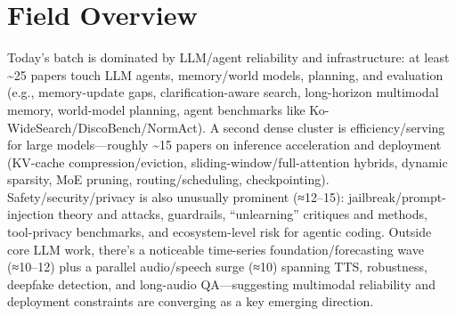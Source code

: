 \documentclass[12pt,letterpaper]{article}
\begin{document}
\medskip



\section*{Field Overview}
{\footnotesize Today's batch is dominated by LLM/agent reliability and infrastructure: at least \textasciitilde{}25 papers touch LLM agents, memory/world models, planning, and evaluation (e.g., memory-update gaps, clarification-aware search, long-horizon multimodal memory, world-model planning, agent benchmarks like Ko-WideSearch/DiscoBench/NormAct). A second dense cluster is efficiency/serving for large models---roughly \textasciitilde{}15 papers on inference acceleration and deployment (KV-cache compression/eviction, sliding-window/full-attention hybrids, dynamic sparsity, MoE pruning, routing/scheduling, checkpointing). Safety/security/privacy is also unusually prominent (≈12--15): jailbreak/prompt-injection theory and attacks, guardrails, ``unlearning'' critiques and methods, tool-privacy benchmarks, and ecosystem-level risk for agentic coding. Outside core LLM work, there's a noticeable time-series foundation/forecasting wave (≈10--12) plus a parallel audio/speech surge (≈10) spanning TTS, robustness, deepfake detection, and long-audio QA---suggesting multimodal reliability and deployment constraints are converging as a key emerging direction.}
\end{document}
